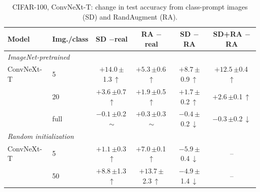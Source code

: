 \begin{table}[htbp]
\centering
\footnotesize
\setlength{\tabcolsep}{4pt}
\caption{CIFAR-100, ConvNeXt-T: change in test accuracy from class-prompt images (SD) and RandAugment (RA).}
\label{tab:paper-convnext}
\begin{tabular}{llcccc}
\toprule
Model & Img./class & \shortstack{SD\\$-$real} & \shortstack{RA\\$-$real} & \shortstack{SD\\$-$RA} & \shortstack{SD+RA\\$-$RA} \\
\midrule
\multicolumn{6}{l}{\textit{ImageNet-pretrained}} \\
ConvNeXt-T & 5 & $+14.0$\,{\scriptsize$\pm$1.3}\,$\uparrow$ & $+5.3$\,{\scriptsize$\pm$0.6}\,$\uparrow$ & $+8.7$\,{\scriptsize$\pm$0.9}\,$\uparrow$ & $+12.5$\,{\scriptsize$\pm$0.4}\,$\uparrow$ \\
 & 20 & $+3.6$\,{\scriptsize$\pm$0.7}\,$\uparrow$ & $+1.9$\,{\scriptsize$\pm$0.5}\,$\uparrow$ & $+1.7$\,{\scriptsize$\pm$0.2}\,$\uparrow$ & $+2.6$\,{\scriptsize$\pm$0.1}\,$\uparrow$ \\
 & full & $-0.1$\,{\scriptsize$\pm$0.2}\,$\sim$ & $+0.3$\,{\scriptsize$\pm$0.3}\,$\sim$ & $-0.4$\,{\scriptsize$\pm$0.2}\,$\downarrow$ & $-0.3$\,{\scriptsize$\pm$0.2}\,$\downarrow$ \\
\midrule
\multicolumn{6}{l}{\textit{Random initialization}} \\
ConvNeXt-T & 5 & $+1.1$\,{\scriptsize$\pm$0.3}\,$\uparrow$ & $+7.0$\,{\scriptsize$\pm$0.1}\,$\uparrow$ & $-5.9$\,{\scriptsize$\pm$0.4}\,$\downarrow$ & -- \\
 & 50 & $+8.8$\,{\scriptsize$\pm$1.3}\,$\uparrow$ & $+13.7$\,{\scriptsize$\pm$2.3}\,$\uparrow$ & $-4.9$\,{\scriptsize$\pm$1.4}\,$\downarrow$ & -- \\
\bottomrule
\end{tabular}
\end{table}
